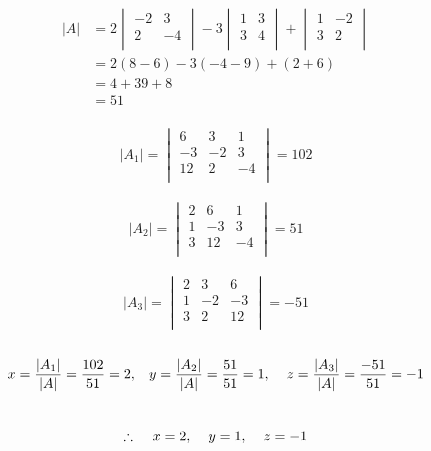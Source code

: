 \documentclass[11pt,a4paper]{article}
\begin{document}
\begin{align*}
|A| &=2
\begin{vmatrix}
-2 & 3\\
2 & -4\\
\end{vmatrix}
-3
\begin{vmatrix}
1 & 3\\
3 & 4\\
\end{vmatrix}
+
\begin{vmatrix}
1 & -2\\
3 & 2\\
\end{vmatrix}\\
& = 2(8-6)-3(-4-9)+(2+6)\\
& = 4 + 39 +8\\
& = 51\\
\end{align*}

$$|A_1|=
\begin{vmatrix}
6 & 3 & 1\\
-3 & -2 & 3\\
12 & 2 & -4\\
\end{vmatrix}
=102$$\\

$$|A_2|=
\begin{vmatrix}
2 & 6 & 1\\
1 & -3 & 3\\
3 & 12 & -4\\
\end{vmatrix}
=51$$\\

$$|A_3|=
\begin{vmatrix}
2 & 3 & 6\\
1 & -2 & -3\\
3 & 2 & 12\\
\end{vmatrix}
=-51$$\\

$$x=\frac{|A_1|}{|A|}=\frac{102}{51}=2,\hspace{0.3cm} y=\frac{|A_2|}{|A|}=\frac{51}{51}=1,\hspace{0.4cm} z=\frac{|A_3|}{|A|}=\frac{-51}{51}=-1$$\\

$$\therefore \hspace{0.4cm} x=2,\hspace{0.4cm} y=1,\hspace{0.4cm} z=-1$$\\
\end{document}
